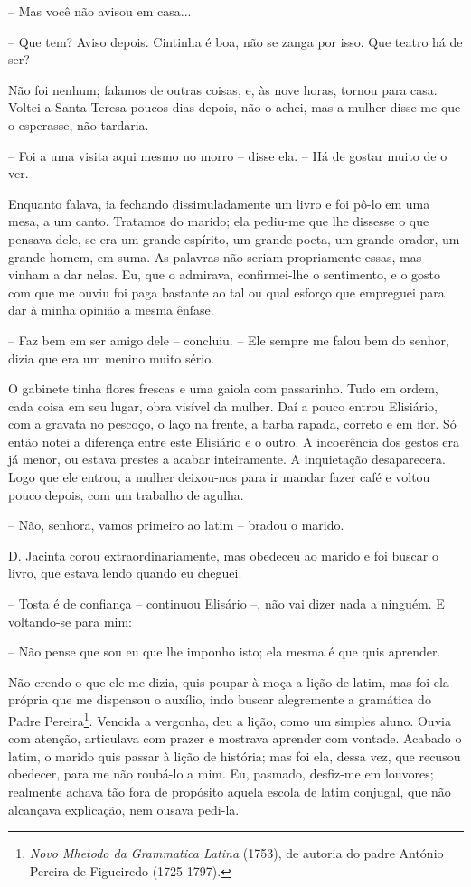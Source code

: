 -- Mas você não avisou em casa...

-- Que tem? Aviso depois. Cintinha é boa, não se zanga por isso. Que
teatro há de ser?

Não foi nenhum; falamos de outras coisas, e, às nove horas, tornou para
casa. Voltei a Santa Teresa poucos dias depois, não o achei, mas a
mulher disse-me que o esperasse, não tardaria.

-- Foi a uma visita aqui mesmo no morro -- disse ela. -- Há de gostar
muito de o ver.

Enquanto falava, ia fechando dissimuladamente um livro e foi pô-lo em
uma mesa, a um canto. Tratamos do marido; ela pediu-me que lhe dissesse
o que pensava dele, se era um grande espírito, um grande poeta, um
grande orador, um grande homem, em suma. As palavras não seriam
propriamente essas, mas vinham a dar nelas. Eu, que o admirava,
confirmei-lhe o sentimento, e o gosto com que me ouviu foi paga bastante
ao tal ou qual esforço que empreguei para dar à minha opinião a mesma
ênfase.

-- Faz bem em ser amigo dele -- concluiu. -- Ele sempre me falou bem do
senhor, dizia que era um menino muito sério.

O gabinete tinha flores frescas e uma gaiola com passarinho. Tudo em
ordem, cada coisa em seu lugar, obra visível da mulher. Daí a pouco
entrou Elisiário, com a gravata no pescoço, o laço na frente, a barba
rapada, correto e em flor. Só então notei a diferença entre este
Elisiário e o outro. A incoerência dos gestos era já menor, ou estava
prestes a acabar inteiramente. A inquietação desaparecera. Logo que ele
entrou, a mulher deixou-nos para ir mandar fazer café e voltou pouco
depois, com um trabalho de agulha.

-- Não, senhora, vamos primeiro ao latim -- bradou o marido.

D. Jacinta corou extraordinariamente, mas obedeceu ao marido e foi
buscar o livro, que estava lendo quando eu cheguei.

-- Tosta é de confiança -- continuou Elisário --, não vai dizer nada a
ninguém. E voltando-se para mim:

-- Não pense que sou eu que lhe imponho isto; ela mesma é que quis
aprender.

Não crendo o que ele me dizia, quis poupar à moça a lição de latim, mas
foi ela própria que me dispensou o auxílio, indo buscar alegremente a
gramática do Padre Pereira\footnote{\emph{Novo Mhetodo da Grammatica
  Latina} (1753), de autoria do padre António Pereira de Figueiredo
  (1725-1797).}. Vencida a vergonha, deu a lição, como um simples aluno.
Ouvia com atenção, articulava com prazer e mostrava aprender com
vontade. Acabado o latim, o marido quis passar à lição de história; mas
foi ela, dessa vez, que recusou obedecer, para me não roubá-lo a mim.
Eu, pasmado, desfiz-me em louvores; realmente achava tão fora de
propósito aquela escola de latim conjugal, que não alcançava explicação,
nem ousava pedi-la.

